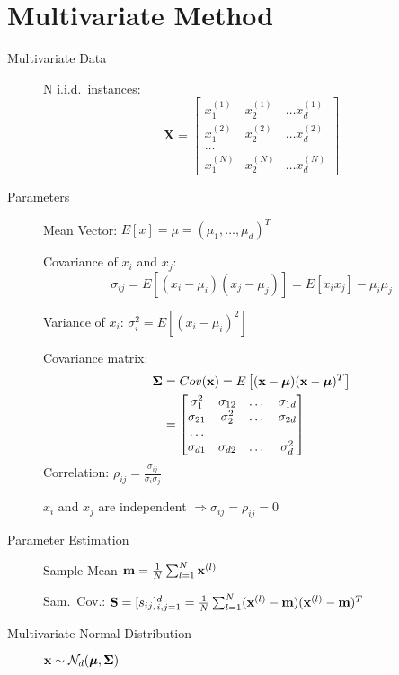 \chapter{Multivariate Method}
\begin{description}
    \item[Multivariate Data]N i.i.d.\ instances:
        \[
            \mathbf{X} = \begin{bmatrix}
                x_1^{(1)}& x_2^{(1)} & \dots x_d^{(1)} \\
                x_1^{(2)} & x_2^{(2)} & \dots x_d^{(2)} \\
                \dots \\
                x_1^{(N)} & x_2^{(N)} & \dots x_d^{(N)}
            \end{bmatrix}
        \]
    \item[Parameters] Mean Vector: $E[x] = \mu = (\mu_1, \dots, \mu_d)^T$

        Covariance of $x_i$ and $x_j$: \[\sigma_{ij} = E\left[ (x_i -
        \mu_i)(x_j-\mu_j) \right] = E[x_i x_j] -\mu_i \mu_j\]

        Variance of $x_i$: $\sigma_i^2 = E\left[ (x_i - \mu_i)^2 \right]$

        Covariance matrix:
        \begin{align*}
         \boldsymbol\Sigma & = Cov(\mathbf{x}) = E\left[ (\mathbf{x} -\boldsymbol\mu)(\mathbf{x}-\boldsymbol\mu)^T \right] \\ &=
            \begin{bmatrix} \sigma_1^2 & \sigma_{12} & \dots & \sigma_{1d} \\
                \sigma_{21} & \sigma_2^2 & \dots  & \sigma_{2d} \\
                \dots\\
                \sigma_{d1} & \sigma_{d2} & \dots & \sigma_d^2
            \end{bmatrix}
        \end{align*}
        Correlation: $\rho_{ij} = \frac{\sigma_{ij}}{\sigma_i \sigma_j} $

        $x_i$ and $x_j$ are independent $\Rightarrow \sigma_{ij} = \rho_{ij} =
        0$
    \item[Parameter Estimation] 
        Sample Mean $\mathbf{m} = \frac{1}{N}\sum_{l=1}^N \mathbf{x}^{(l)}$

        Sam.\ Cov.: $\mathbf{S} = [s_{ij}]^d_{i,j=1} = \frac{1}{N}
        \sum_{l=1}^N(\mathbf{x}^{(l)} -  \mathbf{m})(\mathbf{x}^{(l)} - \mathbf{m})^T$
        
    \item[Multivariate Normal Distribution] $\mathbf{x} \sim \mathcal{N}_d(\boldsymbol\mu, \boldsymbol\Sigma)$


\end{description}
